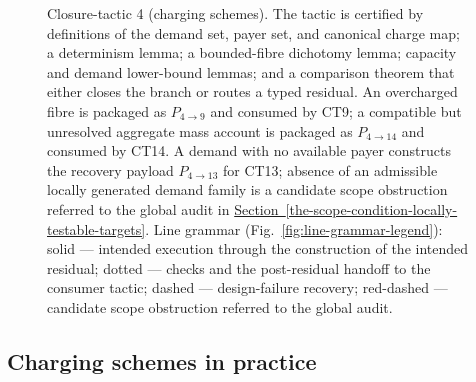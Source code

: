 \documentclass[
  11pt,
]{article}
\theoremstyle{definition}
\newcommand{\secref}[1]{\hyperref[#1]{Section~\ref*{#1}}}
\begin{document}
\begin{figure}[p]
{%
}
\caption[Closure-tactic 4: charging schemes]{Closure-tactic 4 (charging schemes).  The tactic is certified by definitions of the demand set, payer set, and canonical charge map; a determinism lemma; a bounded-fibre dichotomy lemma; capacity and demand lower-bound lemmas; and a comparison theorem that either closes the branch or routes a typed residual.  An overcharged fibre is packaged as \(P_{4\to9}\) and consumed by CT9; a compatible but unresolved aggregate mass account is packaged as \(P_{4\to14}\) and consumed by CT14.  A demand with no available payer constructs the recovery payload \(P_{4\to13}\) for CT13; absence of an admissible locally generated demand family is a candidate scope obstruction referred to the global audit in \secref{the-scope-condition-locally-testable-targets}.  Line grammar (Fig.~\ref{fig:line-grammar-legend}): solid --- intended execution through the construction of the intended residual; dotted --- checks and the post-residual handoff to the consumer tactic; dashed --- design-failure recovery; red-dashed --- candidate scope obstruction referred to the global audit.}
\label{fig:ct4-charging-schemes}
\end{figure}
\FloatBarrier

\subsection*{Charging schemes in practice}
\end{document}
